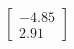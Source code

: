 \documentclass[preview]{standalone}
\begin{document}
\begin{align*}
\begin{bmatrix} -4.85 \\ 2.91 \end{bmatrix}
\end{align*}
\end{document}
